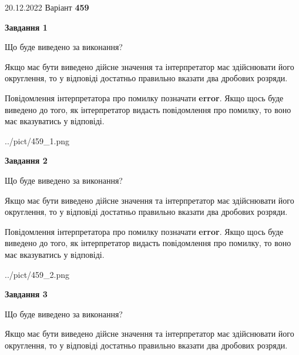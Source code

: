 \documentclass[12pt, ukrainian]{article}
\begin{document}
{20.12.2022 Варіант \No \textbf { 459 }\par}
{
\begin {Large}

{\begin {center}\textbf{Завдання 1}\end {center}}\par
Що буде виведено за виконання? \par

Якщо має бути виведено дійсне значення та інтерпретатор має здійснювати його округлення, 
то у відповіді достатньо правильно вказати два дробових розряди.

Повідомлення інтерпретатора про помилку позначати \textbf{error}.
Якщо щось буде виведено до того, як інтерпретатор видасть повідомлення про помилку, 
то воно має вказуватись у відповіді. \par

\begin{center}
	{../pict/459_1.png}
\end{center}
\newpage

{\begin {center}\textbf{Завдання 2}\end {center}}\par
Що буде виведено за виконання? \par

Якщо має бути виведено дійсне значення та інтерпретатор має здійснювати його округлення, 
то у відповіді достатньо правильно вказати два дробових розряди.

Повідомлення інтерпретатора про помилку позначати \textbf{error}.
Якщо щось буде виведено до того, як інтерпретатор видасть повідомлення про помилку, 
то воно має вказуватись у відповіді. \par

\begin{center}
	{../pict/459_2.png}
\end{center}
\newpage

{\begin {center}\textbf{Завдання 3}\end {center}}\par
Що буде виведено за виконання? \par

Якщо має бути виведено дійсне значення та інтерпретатор має здійснювати його округлення, 
то у відповіді достатньо правильно вказати два дробових розряди.


\end{Large}}
\end{document}
